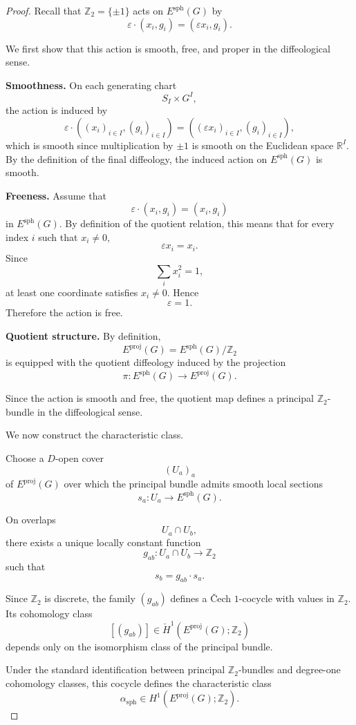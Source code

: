\documentclass[11pt]{amsart}
\begin{document}
\begin{proof}
Recall that \(\mathbb Z_2=\{\pm1\}\) acts on
\(E^{\mathrm{sph}}(G)\) by
\[
\varepsilon\cdot(x_i,g_i)
=
(\varepsilon x_i,g_i).
\]

We first show that this action is smooth, free, and proper in the
diffeological sense.

\medskip

\noindent
\textbf{Smoothness.}
On each generating chart
\[
S_I\times G^I,
\]
the action is induced by
\[
\varepsilon\cdot((x_i)_{i\in I},(g_i)_{i\in I})
=
((\varepsilon x_i)_{i\in I},(g_i)_{i\in I}),
\]
which is smooth since multiplication by \(\pm1\) is smooth on the Euclidean
space \(\mathbb R^I\). By the definition of the final diffeology, the induced
action on \(E^{\mathrm{sph}}(G)\) is smooth.

\medskip

\noindent
\textbf{Freeness.}
Assume that
\[
\varepsilon\cdot(x_i,g_i)=(x_i,g_i)
\]
in \(E^{\mathrm{sph}}(G)\). By definition of the quotient relation, this means
that for every index \(i\) such that \(x_i\neq0\),
\[
\varepsilon x_i=x_i.
\]
Since
\[
\sum_i x_i^2=1,
\]
at least one coordinate satisfies \(x_i\neq0\). Hence
\[
\varepsilon=1.
\]
Therefore the action is free.

\medskip

\noindent
\textbf{Quotient structure.}
By definition,
\[
E^{\mathrm{proj}}(G)
=
E^{\mathrm{sph}}(G)/\mathbb Z_2
\]
is equipped with the quotient diffeology induced by the projection
\[
\pi:E^{\mathrm{sph}}(G)\to E^{\mathrm{proj}}(G).
\]

Since the action is smooth and free, the quotient map defines a principal
\(\mathbb Z_2\)-bundle in the diffeological sense.

\medskip

We now construct the characteristic class.

Choose a \(D\)-open cover
\[
(U_a)_a
\]
of \(E^{\mathrm{proj}}(G)\) over which the principal bundle admits smooth local
sections
\[
s_a:U_a\to E^{\mathrm{sph}}(G).
\]

On overlaps
\[
U_a\cap U_b,
\]
there exists a unique locally constant function
\[
g_{ab}:U_a\cap U_b\to\mathbb Z_2
\]
such that
\[
s_b=g_{ab}\cdot s_a.
\]

Since \(\mathbb Z_2\) is discrete, the family \((g_{ab})\) defines a
Čech \(1\)-cocycle with values in \(\mathbb Z_2\). Its cohomology class
\[
[(g_{ab})]
\in
\check H^1(E^{\mathrm{proj}}(G);\mathbb Z_2)
\]
depends only on the isomorphism class of the principal bundle.

Under the standard identification between principal \(\mathbb Z_2\)-bundles
and degree-one cohomology classes, this cocycle defines the characteristic
class
\[
\alpha_{\mathrm{sph}}
\in
H^1(E^{\mathrm{proj}}(G);\mathbb Z_2).
\]
\end{proof}
\end{document}
